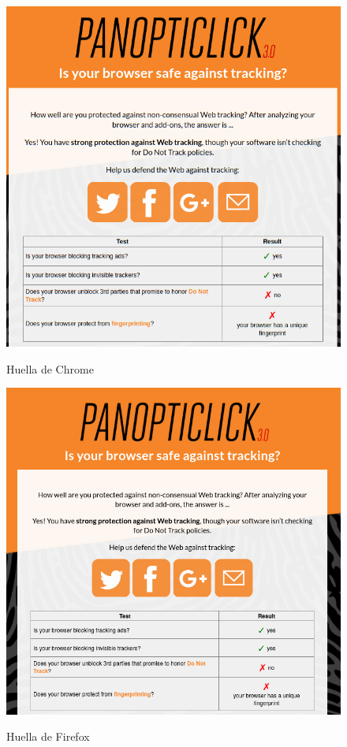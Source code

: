 \documentclass[10pt,a4paper]{article}
\begin{document}
\subsection{}
\begin{figure}[H]
  \centering
  \includegraphics[scale=0.4]{p_chrome.png}\\
  \caption{Huella de Chrome}
  \label{fig:object}
\end{figure}

\begin{figure}[H]
  \centering
  \includegraphics[scale=0.4]{p_firefox.png}\\
  \caption{Huella de Firefox}
  \label{fig:object}
\end{figure}
\end{document}
